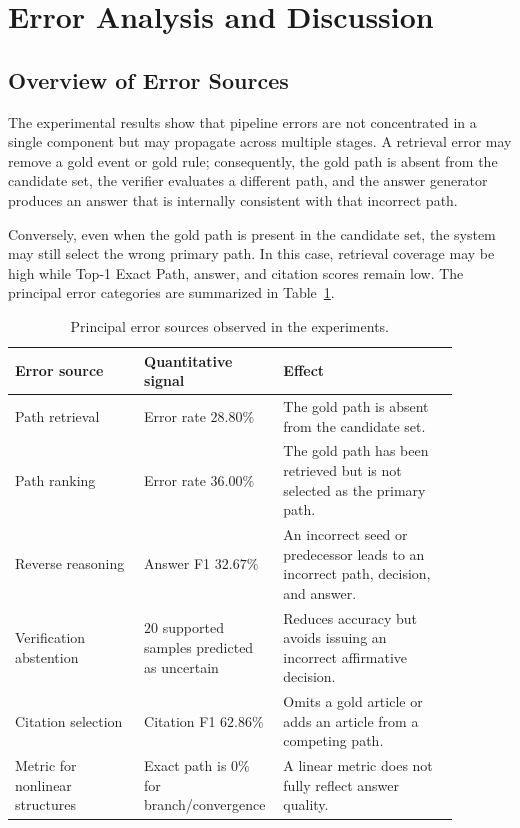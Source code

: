 \section{Error Analysis and Discussion}
\label{sec:discussion}

\subsection{Overview of Error Sources}

The experimental results show that pipeline errors are not concentrated in
a single component but may propagate across multiple stages. A retrieval
error may remove a gold event or gold rule; consequently, the gold path is
absent from the candidate set, the verifier evaluates a different path, and
the answer generator produces an answer that is internally consistent with
that incorrect path.

Conversely, even when the gold path is present in the candidate set, the
system may still select the wrong primary path. In this case, retrieval
coverage may be high while Top-1 Exact Path, answer, and citation scores
remain low. The principal error categories are summarized in
Table~\ref{tab:error-summary}.

\begin{table}[t]
    \centering
    \caption{Principal error sources observed in the experiments.}
    \label{tab:error-summary}
    \begin{tabular}{p{0.28\linewidth}p{0.22\linewidth}p{0.38\linewidth}}
        \hline
        \textbf{Error source} & \textbf{Quantitative signal} &
        \textbf{Effect} \\
        \hline
        Path retrieval &
        Error rate \(28.80\%\) &
        The gold path is absent from the candidate set. \\

        Path ranking &
        Error rate \(36.00\%\) &
        The gold path has been retrieved but is not selected as the primary
        path. \\

        Reverse reasoning &
        Answer F1 \(32.67\%\) &
        An incorrect seed or predecessor leads to an incorrect path,
        decision, and answer. \\

        Verification abstention &
        \(20\) supported samples predicted as uncertain &
        Reduces accuracy but avoids issuing an incorrect affirmative
        decision. \\

        Citation selection &
        Citation F1 \(62.86\%\) &
        Omits a gold article or adds an article from a competing path. \\

        Metric for nonlinear structures &
        Exact path is \(0\%\) for branch/convergence &
        A linear metric does not fully reflect answer quality. \\
        \hline
    \end{tabular}
\end{table}


